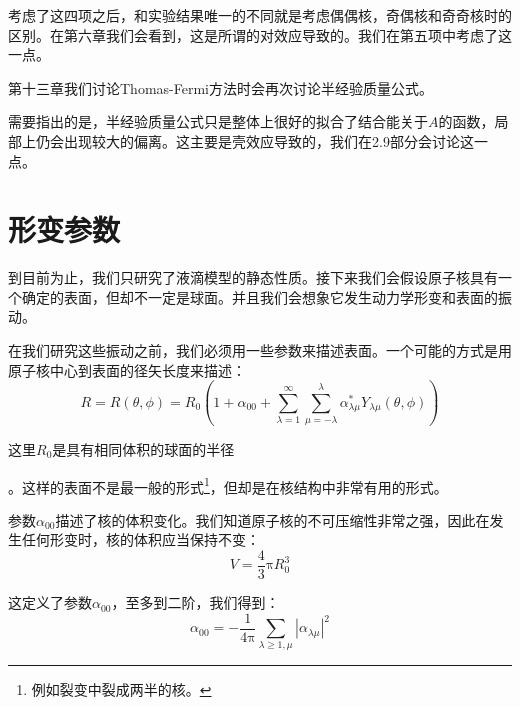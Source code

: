 考虑了这四项之后，和实验结果唯一的不同就是考虑偶偶核，奇偶核和奇奇核时的区别。在第六章我们会看到，这是所谓的对效应导致的。我们在第五项中考虑了这一点。

第十三章我们讨论Thomas-Fermi方法时会再次讨论半经验质量公式。

需要指出的是，半经验质量公式只是整体上很好的拟合了结合能关于$A$的函数，局部上仍会出现较大的偏离。这主要是壳效应导致的，我们在2.9部分会讨论这一点。

\section{形变参数}

到目前为止，我们只研究了液滴模型的静态性质。接下来我们会假设原子核具有一个确定的表面，但却不一定是球面。并且我们会想象它发生动力学形变和表面的振动。

在我们研究这些振动之前，我们必须用一些参数来描述表面。一个可能的方式是用原子核中心到表面的径矢长度来描述：
\begin{equation}
R=R(\theta,\phi)=R_{0}\left(1+\alpha_{00}+\sum^{\infty}_{\lambda=1}\sum^{\lambda}_{\mu=-\lambda}\alpha^{*}_{\lambda\mu}Y_{\lambda\mu}(\theta,\phi)\right)\label{eq:expansion of R}
\end{equation}

这里$R_{0}$是具有相同体积的球面的半径

。这样的表面不是最一般的形式\footnote{例如裂变中裂成两半的核。}，但却是在核结构中非常有用的形式。

参数$\alpha_{00}$描述了核的体积变化。我们知道原子核的不可压缩性非常之强，因此在发生任何形变时，核的体积应当保持不变：
\[
V=\frac{4}{3}\mathrm{\pi}R^{3}_{0}
\]

这定义了参数$\alpha_{00}$，至多到二阶，我们得到\cite{EG70}：
\[
\alpha_{00}=-\frac{1}{4\mathrm{\pi}}\sum_{\lambda\geq1,\mu}\left|\alpha_{\lambda\mu}\right|^{2}
\]


